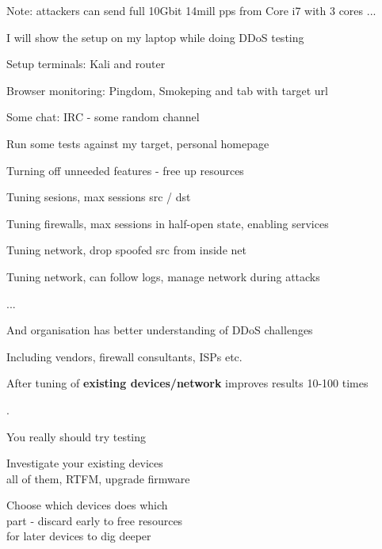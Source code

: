 \documentclass[20pt,landscape,a4paper,footrule]{foils}
\begin{document}
\vskip 2cm
Note: attackers can send full 10Gbit 14mill pps from Core i7 with 3 cores ...



\begin{list1}
\item I will show the setup on my laptop while doing DDoS testing
\begin{list2}
\item Setup terminals: Kali and router
\item Browser monitoring: Pingdom, Smokeping and tab with target url
\item Some chat: IRC - some random channel
\end{list2}
\item Run some tests against my target, personal homepage
\end{list1}


\begin{list1}
\item Turning off unneeded features - free up resources
\item Tuning sesions, max sessions src / dst
\item Tuning firewalls, max sessions in half-open state, enabling services
\item Tuning network, drop spoofed src from inside net \smiley
\item Tuning network, can follow logs, manage network during attacks
\item ...
\item And organisation has better understanding of DDoS challenges
\item Including vendors, firewall consultants, ISPs etc.
\end{list1}

\vskip 1cm
\centerline{After tuning of {\bf existing devices/network} improves results 10-100 times}


.
\begin{list1}
\item You really should try testing
\item Investigate your existing devices\\
all of them, RTFM, upgrade firmware
\item Choose which devices does which\\
part - discard early to free resources\\
for later devices to dig deeper
\end{list1}
\end{document}
